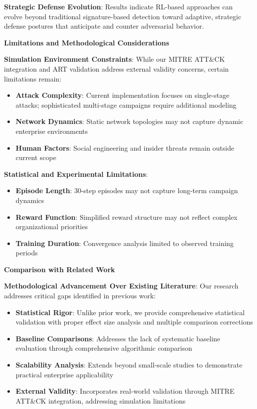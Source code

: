 \documentclass[12pt,oneside]{article}
\begin{document}
\textbf{Strategic Defense Evolution}: Results indicate RL-based approaches can evolve beyond traditional signature-based detection toward adaptive, strategic defense postures that anticipate and counter adversarial behavior.

\textbf{Limitations and Methodological Considerations}

\textbf{Simulation Environment Constraints}:
While our MITRE ATT\&CK integration and ART validation address external validity concerns, certain limitations remain:
\begin{itemize}
    \item \textbf{Attack Complexity}: Current implementation focuses on single-stage attacks; sophisticated multi-stage campaigns require additional modeling
    \item \textbf{Network Dynamics}: Static network topologies may not capture dynamic enterprise environments
    \item \textbf{Human Factors}: Social engineering and insider threats remain outside current scope
\end{itemize}

\textbf{Statistical and Experimental Limitations}:
\begin{itemize}
    \item \textbf{Episode Length}: 30-step episodes may not capture long-term campaign dynamics
    \item \textbf{Reward Function}: Simplified reward structure may not reflect complex organizational priorities
    \item \textbf{Training Duration}: Convergence analysis limited to observed training periods
\end{itemize}

\textbf{Comparison with Related Work}

\textbf{Methodological Advancement Over Existing Literature}:
Our research addresses critical gaps identified in previous work:
\begin{itemize}
    \item \textbf{Statistical Rigor}: Unlike prior work, we provide comprehensive statistical validation with proper effect size analysis and multiple comparison corrections
    \item \textbf{Baseline Comparisons}: Addresses the lack of systematic baseline evaluation through comprehensive algorithmic comparison
    \item \textbf{Scalability Analysis}: Extends beyond small-scale studies to demonstrate practical enterprise applicability
    \item \textbf{External Validity}: Incorporates real-world validation through MITRE ATT\&CK integration, addressing simulation limitations
\end{itemize}
\end{document}
